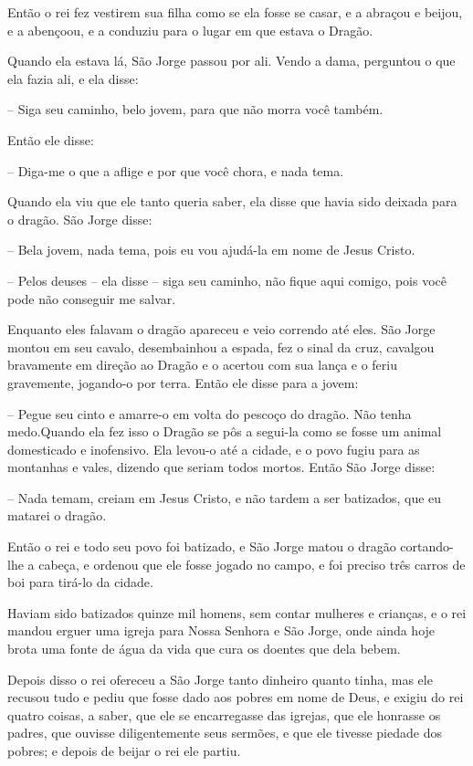Então o rei fez vestirem sua filha como se ela fosse se casar, e a
abraçou e beijou, e a abençoou, e a conduziu para o lugar em que
estava o Dragão. 

Quando ela estava lá, São Jorge passou por ali. Vendo a dama,
perguntou o que ela fazia ali, e ela disse:

-- Siga seu caminho, belo jovem, para que não morra você também.

Então ele disse:

-- Diga-me o que a aflige e por que você chora, e nada tema.

Quando ela viu que ele tanto queria saber, ela disse que havia sido
deixada para o dragão. São Jorge disse:

-- Bela jovem, nada tema, pois eu vou ajudá-la em nome de Jesus Cristo.


-- Pelos deuses -- ela disse -- siga seu caminho, não fique aqui comigo,
pois você pode não conseguir me salvar.

Enquanto eles falavam o dragão apareceu e veio correndo até eles. São
Jorge montou em seu cavalo, desembainhou a espada, fez o sinal da
cruz, cavalgou bravamente em direção ao Dragão e o acertou com sua
lança e o feriu gravemente, jogando-o por terra. Então ele disse para
a jovem:

-- Pegue seu cinto e amarre-o em volta do pescoço do dragão. Não tenha
medo.Quando ela fez isso o Dragão se pôs a segui-la como se fosse um
animal domesticado e inofensivo. Ela levou-o até a cidade, e o povo
fugiu para as montanhas e vales, dizendo que seriam todos mortos.
Então São Jorge disse: 

-- Nada temam, creiam em Jesus Cristo, e não tardem a ser batizados,
que eu matarei o dragão. 

Então o rei e todo seu povo foi batizado, e São Jorge matou o dragão
cortando-lhe a cabeça, e ordenou que ele fosse jogado no campo, e foi
preciso três carros de boi para tirá-lo da cidade. 

Haviam sido batizados quinze mil homens, sem contar mulheres e
crianças, e o rei mandou erguer uma igreja para Nossa Senhora e São
Jorge, onde ainda hoje brota uma fonte de água da vida que cura os
doentes que dela bebem.

Depois disso o rei ofereceu a São Jorge tanto dinheiro quanto tinha,
mas ele recusou tudo e pediu que fosse dado aos pobres em nome de
Deus, e exigiu do rei quatro coisas, a saber, que ele se encarregasse
das igrejas, que ele honrasse os padres, que ouvisse diligentemente
seus sermões, e que ele tivesse piedade dos pobres; e depois de
beijar o rei ele partiu.

